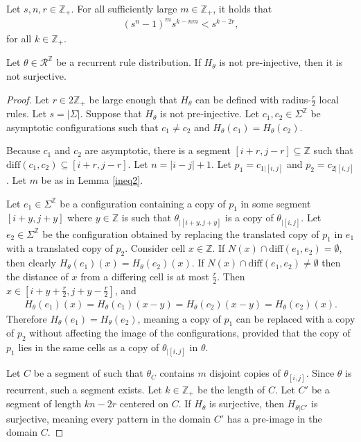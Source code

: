 \documentclass[10pt,a4paper]{amsart}
\newcommand{\Z}{\mathbb{Z}}
\begin{document}
\begin{lemma} \label{ineq2}
Let $s,n,r \in \Z_+$. For all sufficiently large $m \in \Z_+$, it holds that
\begin{align*}
(s^n-1)^m s^{k-nm} < s^{k-2r},
\end{align*}
for all $k \in \Z_+$.
\end{lemma}

\begin{lemma} \label{rgoe2}
Let $\theta \in \mathcal{R}^\Z$ be a recurrent rule distribution. If $H_\theta$ is not pre-injective, then it is not surjective. 
\end{lemma}

\begin{proof}
Let $r \in 2\Z_+$ be large enough that $H_\theta$ can be defined with radius-$\frac{r}{2}$ local rules. Let $s = |\Sigma|$. Suppose that $H_\theta$ is not pre-injective. Let $c_1,c_2 \in \Sigma^\Z$ be asymptotic configurations such that $c_1 \neq c_2$ and $H_\theta (c_1) = H_\theta (c_2)$.

Because $c_1$ and $c_2$ are asymptotic, there is a segment $[i+r,j-r] \subseteq \Z$ such that $\mathrm{diff}(c_1,c_2) \subseteq [i+r, j-r]$. Let $n = |i-j| +1$. Let $p_1 = c_{1|[i,j]}$ and $p_2 = c_{2|[i,j]}$. Let $m$ be as in Lemma \ref{ineq2}.

Let $e_1 \in \Sigma^\Z$ be a configuration containing a copy of $p_1$ in some segment $[i+y,j+y]$ where $y\in\Z$ is such that $\theta_{|[i+y,j+y]}$ is a copy of $\theta_{|[i,j]}$. Let $e_2 \in \Sigma^\Z$ be the configuration obtained by replacing the translated copy of $p_1$ in $e_1$ with a translated copy of $p_2$. Consider cell $x \in \Z$. If $N(x) \cap \mathrm{diff}(e_1,e_2) = \emptyset$, then clearly $H_\theta (e_1)(x) = H_\theta (e_2)(x)$.  If $N(x) \cap \mathrm{diff}(e_1,e_2) \neq \emptyset$ then the distance of $x$ from a differing cell is at most $\frac{r}{2}$. Then $x \in [i+y+\frac{r}{2},j+y-\frac{r}{2}]$, and
\begin{align*}
H_\theta (e_1)(x) = H_\theta (c_1)(x-y)= H_\theta(c_2)(x-y) = H_\theta (e_2)(x).
\end{align*}
Therefore $H_\theta (e_1) = H_\theta (e_2)$, meaning a copy of $p_1$ can be replaced with a copy of $p_2$ without affecting the image of the configurations, provided that the copy of $p_1$ lies in the same cells as a copy of $\theta_{|[i,j]}$ in $\theta$.

Let $C$ be a segment of such that $\theta_C$ contains $m$ disjoint copies of $\theta_{[i,j]}$. Since $\theta$ is recurrent, such a segment exists. Let $k\in \Z_+$ be the length of $C$. Let $C'$ be a segment of length $kn-2r$ centered on $C$. If $H_\theta$ is surjective, then $H_{\theta|C'}$ is surjective, meaning every pattern in the domain $C'$ has a pre-image in the domain $C$. 


\end{proof}
\end{document}

